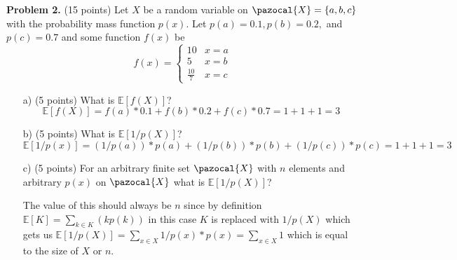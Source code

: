 \documentclass[a4 paper]{article}
\begin{document}
	\textbf{Problem 2.} (15 points) Let $X$ be a random variable on $\pazocal{X} = \{a,b,c\}$ with the probability mass function  $p(x)$. Let $p(a) = 0.1, p(b) = 0.2,$ and $p(c) = 0.7$ and some function $f(x)$ be 
	\begin{equation*}
	f(x) = \begin{cases}
	10 & x=a \\
	5 & x=b \\
	\frac{10}{7} & x=c
	\end{cases}
	\end{equation*}
	\begin{enumerate}
	\item[a)] (5 points) What is $\mathbb{E}[f(X)]$?
	\begin{equation*}
	\mathbb{E}[f(X)] = f(a) * 0.1 + f(b) *0.2 + f(c) * 0.7 = 1 + 1 + 1 = 3
	\end{equation*}
	\item[b)] (5 points) What is $\mathbb{E}[1/p(X)]$? 
	\begin{equation*}
	\mathbb{E}[1/p(x)] = (1/p(a))*p(a) + (1/p(b))*p(b) + (1/p(c))*p(c) =1+1+1 = 3
	\end{equation*}
	\item[c)] (5 points) For an arbitrary finite set $\pazocal{X}$ with $n$ elements and arbitrary $p(x)$ on $\pazocal{X}$ what is $\mathbb{E}[1/p(X)]$?
	
	The value of this should always be $n$ since by definition $\mathbb{E}[K] = \sum_{k\in K}{(kp(k))}$ in this case $K$ is replaced with $1/p(X)$ which gets us $\mathbb{E}[1/p(X)] = \sum_{x \in X} 1/p(x)*p(x) = \sum_{x \in X}{1}$ which is equal to the size of $X$ or $n$.
	\end{enumerate}
	
\end{document}
